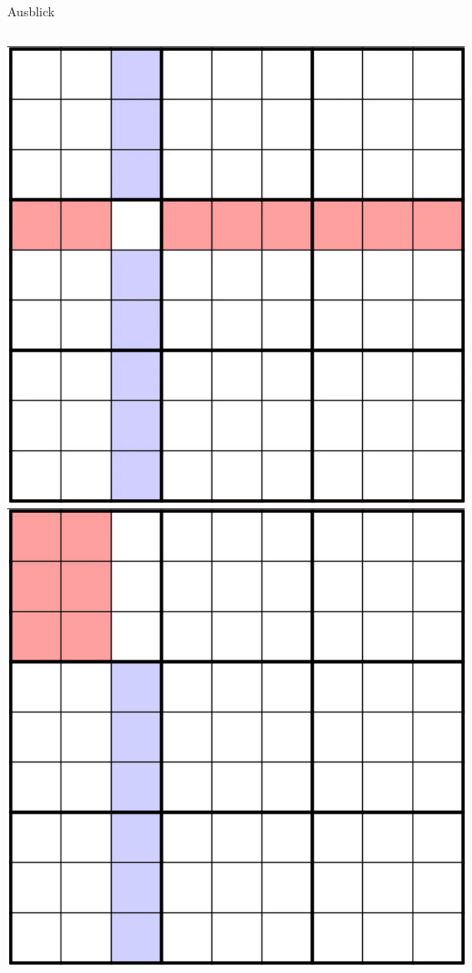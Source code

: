 \begin{frame}{Ausblick}
    \begin{columns}[T] %
        \begin{column}{0.3\textwidth}
            \vspace*{0.5cm}
            \includegraphics[width=\textwidth]{Pictures/H3.png} \\
            \vspace*{0.5cm}
            \includegraphics[width=\textwidth]{Pictures/H5.png}

\end{column}
\end{columns}
\end{frame}
